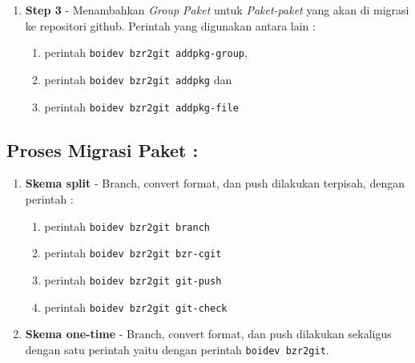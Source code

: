 {\begin{enumerate}
\begin{itemize}
		\item Opsi Generate Key GnuPG.
		
		\item Memasukkan alamat bazaar repositori\\ (example: \textbf{http://dev.blankonlinux.or.id/browser/tambora})

		\item Memasukkan alamat github repositori\\ (example: \textbf{https://github.com/blankon-packages})	
	\end{itemize}
	
	\item \textbf{Step 3} -  Menambahkan \textit{Group Paket} untuk \textit{Paket-paket} yang akan di migrasi ke repositori github. Perintah yang digunakan antara lain :
	\label{itm:pre_step3}
	\begin{enumerate}
		\item perintah \texttt{boidev bzr2git addpkg-group},
		\item perintah \texttt{boidev bzr2git addpkg} dan
		\item perintah \texttt{boidev bzr2git addpkg-file}
	\end{enumerate}
\end{enumerate}

\subsection{Proses Migrasi Paket :}
\begin{enumerate}
	
	\item \textbf{Skema split} - Branch, convert format, dan push dilakukan terpisah, dengan perintah :
	\label{itm:metode_split}
	\begin{enumerate}
		\item perintah \texttt{boidev bzr2git branch}
		\item perintah \texttt{boidev bzr2git bzr-cgit}
		\item perintah \texttt{boidev bzr2git git-push}
		\item perintah \texttt{boidev bzr2git git-check}
	\end{enumerate}
	
	\item \textbf{Skema one-time} - Branch, convert format, dan push dilakukan sekaligus dengan satu perintah yaitu dengan perintah \texttt{boidev bzr2git}.
	\label{itm:metode_one-time}
\end{enumerate}

}
